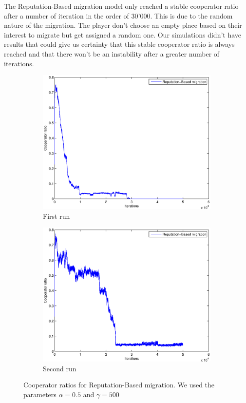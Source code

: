 \documentclass[11pt]{article}
\begin{document}
The Reputation-Based migration model only reached a stable cooperator ratio after a number of iteration in the order of 30'000. This is due to the random nature of the migration. The player don't choose an empty place based on their interest to migrate but get assigned a random one. Our simulations didn't have results that could give us certainty that this stable cooperator ratio is always reached and that there won't be an instability after a greater number of iterations.

\begin{figure}
	\centering
	\begin{subfigure}[t]{0.48\textwidth}
        \includegraphics[width=\textwidth]{../../other/plots/convergence-50000.eps}
	\caption{First run}
    	\end{subfigure}
	\begin{subfigure}[t]{0.48\textwidth}
        \includegraphics[width=\textwidth]{../../other/plots/convergence-50000-2.eps}
	\caption{Second run}
    	\end{subfigure}

	\caption{Cooperator ratios for Reputation-Based migration. We used the parameters $\alpha = 0.5$ and $\gamma = 500$}
	\label{fig:convergence_reputation}
\end{figure}
\end{document}
